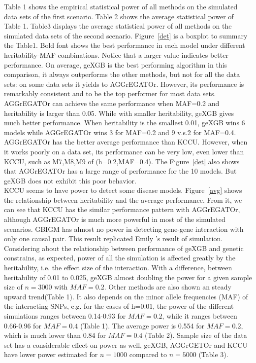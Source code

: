 \documentclass[11pt]{article}
\theoremstyle{plain}
\theoremstyle{definition}
\theoremstyle{remark}
\begin{document}
\noindent Table 1 shows the empirical statistical power of all methods on the simulated data sets of the first scenario. Table 2 shows the average statistical power of Table 1. Table3 displays the average statistical power of all methods on the simulated data sets of the second scenario. Figure~\ref{det} is a boxplot to summary the Table1. Bold font shows the best performance in each model under different heritability-MAF combinations. Notice that a larger value indicates better performance. On average, geXGB is the best performing algorithm in this comparison, it always outperforms the other methods, but not for all the data sets: on some data sets it yields to AGGrEGATOr. However, its performance is remarkably consistent and to be the top performer for most data sets. AGGrEGATOr can achieve the same performance when MAF=0.2 and heritability is larger than 0.05. While with smaller heritability, geXGB gives much better performance. When heritability is the smallest 0.01, geXGB wins 6 models while AGGrEGATOr wins 3 for MAF=0.2 and 9 v.s.2 for MAF=0.4. AGGrEGATOr has the better average performance than KCCU. However, when it works poorly on a data set, its performance can be very low, even lower than KCCU, such as M7,M8,M9 of (h=0.2,MAF=0.4). The Figure~\ref{det} also shows that AGGrEGATOr has a large range of performance for the 10 models. But geXGB does not exhibit this poor behavior. \\

\noindent KCCU seems to have power to detect some disease models. Figure~\ref{avg} shows the relationship between heritability and the average performance. From it, we can see that KCCU has the similar performance pattern with AGGrEGATOr, although AGGrEGATOr is much more powerful in most of the simulated scenarios. GBIGM has almost no power in detecting gene-gene interaction with only one causal pair. This result replicated Emily \cite{7}'s result of simulation. \\

\noindent Considering about the relationship between performance of geXGB and genetic constrains, as expected, power of all the simulation is affected greatly by the heritability, i.e. the effect size of the interaction. With a difference, between heritability of 0.01 to 0.025, geXGB almost doubling the power for a given sample size of $n=3000$ with $MAF=0.2$. Other methods are also shown an steady upward trend(Table 1). It also depends on the minor allele frequencies (MAF) of the interacting SNPs, e.g. for the cases of h=0.01, the power of the different simulations ranges between 0.14-0.93 for $MAF=0.2$, while it ranges between 0.66-0.96 for $MAF=0.4$ (Table 1). The average power is 0.554 for $MAF=0.2$, which is much lower than 0.84 for $MAF=0.4$ (Table 2). Sample size of the data set has a considerable effect on power as well, geXGB, AGGrGETOr and KCCU have lower power estimated for $n=1000$ compared to $n=5000$ (Table 3).
\end{document}
